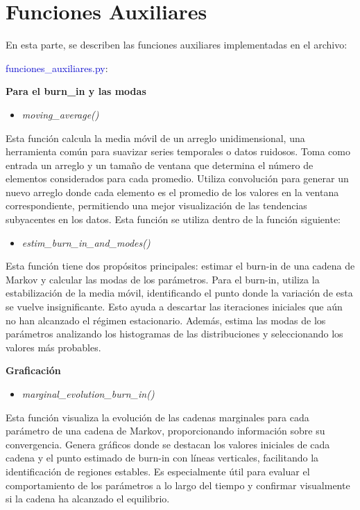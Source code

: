 \newpage
\section{Funciones Auxiliares} \label{sec:funauc}

En esta parte, se describen las funciones auxiliares implementadas en el archivo:
\begin{center}
	\textcolor{mediumblue}{funciones\_auxiliares.py}:
\end{center}

\textbf{Para el burn\_in y las modas}
\begin{itemize}
	\item \textit{moving\_average()}
\end{itemize}
Esta función calcula la media móvil de un arreglo unidimensional, una herramienta común para suavizar series temporales o datos ruidosos. Toma como entrada un arreglo y un tamaño de ventana que determina el número de elementos considerados para cada promedio. Utiliza convolución para generar un nuevo arreglo donde cada elemento es el promedio de los valores en la ventana correspondiente, permitiendo una mejor visualización de las tendencias subyacentes en los datos. Esta función se utiliza dentro de la función siguiente:

\begin{itemize}
	\item \textit{estim\_burn\_in\_and\_modes()}
\end{itemize}
Esta función tiene dos propósitos principales: estimar el burn-in de una cadena de Markov y calcular las modas de los parámetros. Para el burn-in, utiliza la estabilización de la media móvil, identificando el punto donde la variación de esta se vuelve insignificante. Esto ayuda a descartar las iteraciones iniciales que aún no han alcanzado el régimen estacionario. Además, estima las modas de los parámetros analizando los histogramas de las distribuciones y seleccionando los valores más probables.

\textbf{Graficación}
\begin{itemize}
	\item \textit{marginal\_evolution\_burn\_in()}
\end{itemize}
Esta función visualiza la evolución de las cadenas marginales para cada parámetro de una cadena de Markov, proporcionando información sobre su convergencia. Genera gráficos donde se destacan los valores iniciales de cada cadena y el punto estimado de burn-in con líneas verticales, facilitando la identificación de regiones estables. Es especialmente útil para evaluar el comportamiento de los parámetros a lo largo del tiempo y confirmar visualmente si la cadena ha alcanzado el equilibrio.

